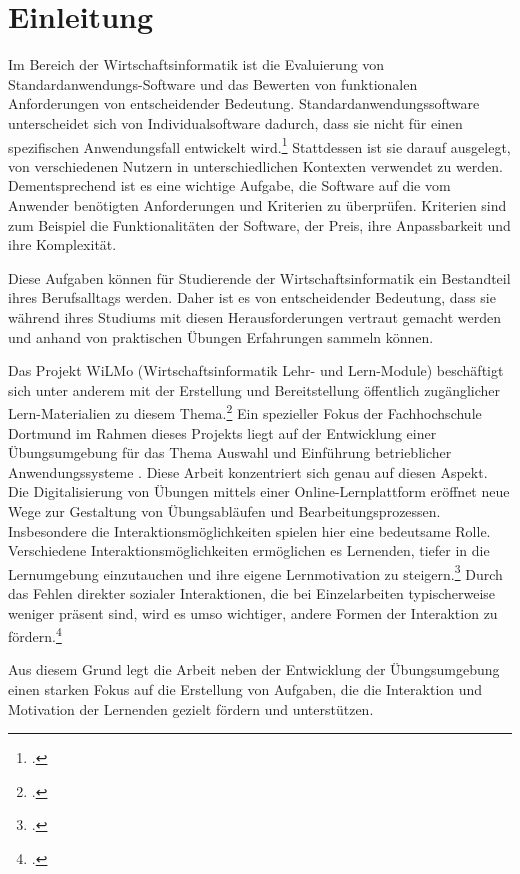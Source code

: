 \chapter{Einleitung}


Im Bereich der Wirtschaftsinformatik ist die Evaluierung von
Standardanwendungs-Software und das Bewerten von funktionalen Anforderungen von entscheidender Bedeutung.
Standardanwendungssoftware unterscheidet sich von Individualsoftware dadurch, dass sie nicht für einen spezifischen Anwendungsfall entwickelt wird.\footcite[Vgl.][S. 3]{Teich2008}{}{} Stattdessen ist sie darauf ausgelegt, von verschiedenen Nutzern in unterschiedlichen Kontexten verwendet zu werden.
Dementsprechend ist es eine wichtige Aufgabe, die Software auf die vom Anwender benötigten Anforderungen und Kriterien zu überprüfen. Kriterien sind zum Beispiel die Funktionalitäten der Software, der Preis, ihre Anpassbarkeit und ihre Komplexität.

Diese Aufgaben können für Studierende der Wirtschaftsinformatik ein Bestandteil ihres Berufsalltags  werden. Daher ist es von entscheidender Bedeutung, dass sie während ihres Studiums mit diesen Herausforderungen vertraut gemacht werden und anhand von praktischen Übungen Erfahrungen sammeln können.

Das Projekt WiLMo (Wirtschaftsinformatik Lehr- und Lern-Module) beschäftigt sich unter anderem mit der Erstellung und Bereitstellung öffentlich zugänglicher Lern-Materialien zu diesem Thema.\footcite[][]{wilmo}{}{}
Ein spezieller Fokus der Fachhochschule Dortmund im Rahmen dieses Projekts liegt auf der Entwicklung einer Übungsumgebung für das Thema \glqq Auswahl und Einführung betrieblicher Anwendungssysteme\grqq
. Diese Arbeit konzentriert sich genau auf diesen Aspekt.
Die Digitalisierung von Übungen mittels einer Online-Lernplattform eröffnet neue Wege zur Gestaltung von Übungsabläufen und Bearbeitungsprozessen.
Insbesondere die Interaktionsmöglichkeiten spielen hier eine bedeutsame Rolle.
Verschiedene Interaktionsmöglichkeiten ermöglichen es Lernenden, tiefer in die Lernumgebung einzutauchen und ihre eigene Lernmotivation zu steigern.\footcite[Vgl.][S.638]{BolognaDigital}{}{}
Durch das Fehlen direkter sozialer Interaktionen, die bei Einzelarbeiten typischerweise weniger präsent sind, wird es umso wichtiger, andere Formen der Interaktion zu fördern.\footcite[Vgl.][S.638]{BolognaDigital}{}{}

Aus diesem Grund legt die Arbeit neben der Entwicklung der Übungsumgebung einen starken Fokus auf die Erstellung von Aufgaben, die die Interaktion und Motivation der Lernenden gezielt fördern und unterstützen.

